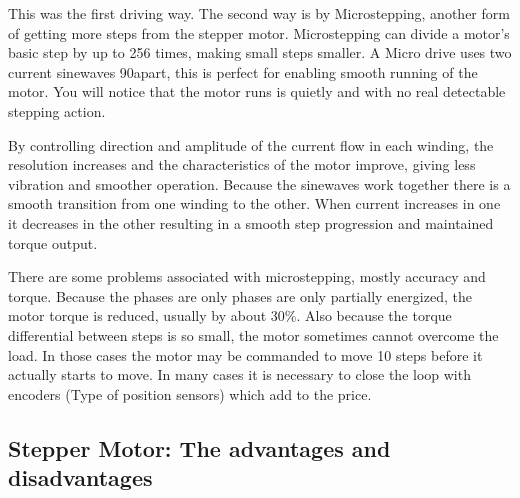 \documentclass[journal]{IEEEtran}
\begin{document}

This was the first driving way. The second way is by Microstepping, another form of getting more steps from the stepper motor.
Microstepping can divide a motor’s basic step by up to 256 times, making small steps smaller. A Micro drive uses two current sinewaves 90\textdegree apart, this is perfect for enabling smooth running of the motor. You will notice that the motor runs is quietly and with no real detectable stepping action.

By controlling direction and amplitude of the current flow in each winding, the resolution increases and the characteristics of the motor improve, giving less vibration and smoother operation. Because the sinewaves work together there is a smooth transition from one winding to the other. When current increases in one it decreases in the other resulting in a smooth step progression and maintained torque output.\cite{website_microstep}


There are some problems associated with microstepping, mostly accuracy and torque. Because the phases are only phases are only partially energized, the motor torque is reduced, usually by about 30\%. Also because the torque differential between steps is so small, the motor sometimes cannot overcome the load. In those cases the motor may be commanded to move 10 steps before it actually starts to move. In many cases it is necessary to close the loop with encoders (Type of position sensors) which add to the price.\cite{microstep_last_website}





\subsection{Stepper Motor: The advantages and disadvantages}
\end{document}

